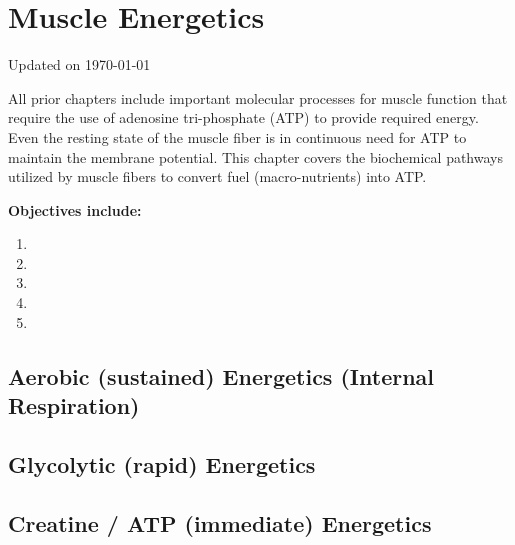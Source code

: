 \chapter{Muscle Energetics}\label{chp:energetics}
Updated on \today
\minitoc

All prior chapters include important molecular processes for muscle function that require the use of adenosine tri-phosphate (ATP) to provide required energy. Even the resting state of the muscle fiber is in continuous need for ATP to maintain the membrane potential. This chapter covers the biochemical pathways utilized by muscle fibers to convert fuel (macro-nutrients) into ATP.

\vspace{5mm}

\textbf{Objectives include:}
\begin{enumerate}
    \item
    \item
    \item
    \item
    \item
\end{enumerate}

\section{Aerobic (sustained) Energetics (Internal Respiration)}

\section{Glycolytic (rapid) Energetics}

\section{Creatine / ATP (immediate) Energetics}

\printbibliography[heading=subbibintoc]